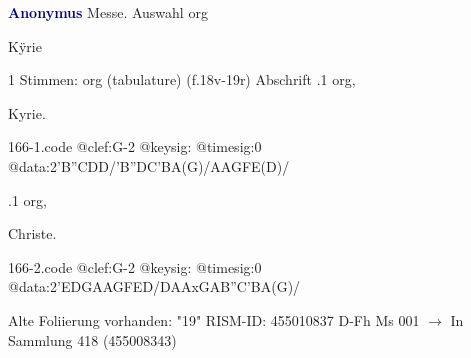 \documentclass[twocolumn]{book}
\begin{document}
\newline \par \vspace{7pt} \textcolor{darkblue}{\textbf{Anonymus  }}
\newline Messe. Auswahl
\newline org
\newline \begin{itshape}[f.18v, at left:] Kÿrie\end{itshape} 
\newline \textcolor{darkblue}{}  1 Stimmen: org (tabulature)  (f.18v-19r)
\newline Abschrift
.1  org, \begin{itshape}Kyrie.\end{itshape}  
\begin{filecontents*}{166-1.code}
@clef:G-2
@keysig:
@timesig:0
@data:2'B''CDD/'B''DC'BA(G)/AAGFE(D)/
\end{filecontents*}
\newline
%
.1  org, \begin{itshape}Christe.\end{itshape}  
\begin{filecontents*}{166-2.code}
@clef:G-2
@keysig:
@timesig:0
@data:2'EDGAAGFED/DAAxGAB''C'BA(G)/
\end{filecontents*}
\newline
%
\newline Alte Foliierung vorhanden: "19"
\newline RISM-ID: 455010837
\newline D-Fh  Ms 001
\newline $\rightarrow$ In Sammlung 418 (455008343)
      
\end{document}
